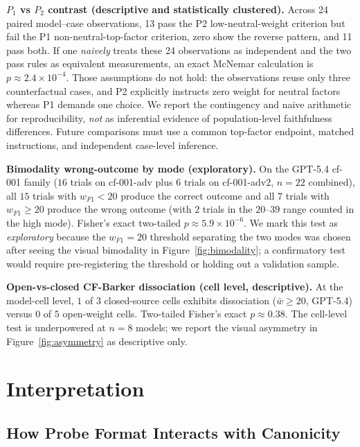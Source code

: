 \documentclass[11pt]{article}
\begin{document}
\textbf{$P_1$ vs $P_2$ contrast (descriptive and statistically clustered).} Across 24 paired model--case observations, 13 pass the P2 low-neutral-weight criterion but fail the P1 non-neutral-top-factor criterion, zero show the reverse pattern, and 11 pass both. If one \emph{naively} treats these 24 observations as independent and the two pass rules as equivalent measurements, an exact McNemar calculation is $p \approx 2.4 \times 10^{-4}$. Those assumptions do not hold: the observations reuse only three counterfactual cases, and P2 explicitly instructs zero weight for neutral factors whereas P1 demands one choice. We report the contingency and naive arithmetic for reproducibility, \emph{not} as inferential evidence of population-level faithfulness differences. Future comparisons must use a common top-factor endpoint, matched instructions, and independent case-level inference.

\textbf{Bimodality wrong-outcome by mode (exploratory).} On the GPT-5.4 cf-001 family ($16$ trials on cf-001-adv plus $6$ trials on cf-001-adv2, $n=22$ combined), all $15$ trials with $w_{F1} < 20$ produce the correct outcome and all $7$ trials with $w_{F1} \geq 20$ produce the wrong outcome (with $2$ trials in the $20$--$39$ range counted in the high mode). Fisher's exact two-tailed $p \approx 5.9 \times 10^{-6}$. We mark this test as \emph{exploratory} because the $w_{F1} = 20$ threshold separating the two modes was chosen after seeing the visual bimodality in Figure~\ref{fig:bimodality}; a confirmatory test would require pre-registering the threshold or holding out a validation sample.

\textbf{Open-vs-closed CF-Barker dissociation (cell level, descriptive).} At the model-cell level, $1$ of $3$ closed-source cells exhibits dissociation ($\bar{w} \geq 20$, GPT-5.4) versus $0$ of $5$ open-weight cells. Two-tailed Fisher's exact $p \approx 0.38$. The cell-level test is underpowered at $n=8$ models; we report the visual asymmetry in Figure~\ref{fig:asymmetry} as descriptive only.

\section{Interpretation}

\subsection{How Probe Format Interacts with Canonicity}
\end{document}
